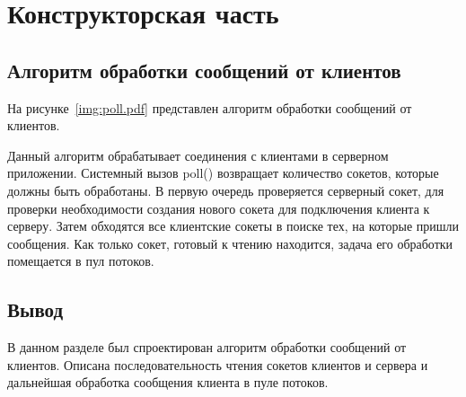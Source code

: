 \chapter{Конструкторская часть}
\section{Алгоритм обработки сообщений от клиентов}
На рисунке~\ref{img:poll.pdf} представлен алгоритм обработки сообщений от клиентов.

Данный алгоритм обрабатывает соединения с клиентами в серверном приложении. 
Системный вызов poll() возвращает количество сокетов, которые должны быть обработаны. В первую очередь проверяется серверный сокет, для проверки необходимости создания нового сокета для подключения клиента к серверу. Затем обходятся все клиентские сокеты в поиске тех, на которые пришли сообщения. Как только сокет, готовый к чтению находится, задача его обработки помещается в пул потоков.

\section*{Вывод}
В данном разделе был спроектирован алгоритм обработки сообщений от клиентов. Описана 
последовательность чтения сокетов клиентов и сервера и дальнейшая обработка сообщения 
клиента в пуле потоков.
